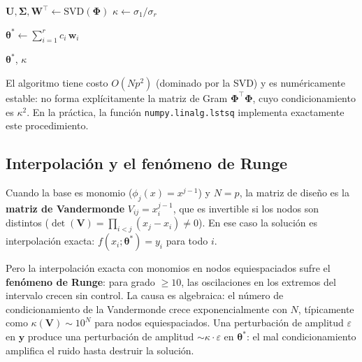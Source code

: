 \begin{algorithm}[H]
\caption{Ajuste por mínimos cuadrados vía SVD}
\label{alg:mc_svd}
 
 
$\bm{U}, \bm{\Sigma}, \bm{W}^\top \leftarrow \mathrm{SVD}(\bm{\Phi})$
$\kappa \leftarrow \sigma_1 / \sigma_r$
 
$\bm{\theta}^* \leftarrow \sum_{i=1}^r c_i\,\bm{w}_i$\;
 
\Return $\bm{\theta}^*$, $\kappa$\;
\end{algorithm}
 
El algoritmo tiene costo $O(Np^2)$ (dominado por la SVD) y es
numéricamente estable: no forma explícitamente la matriz de Gram
$\bm{\Phi}^\top\bm{\Phi}$, cuyo condicionamiento es $\kappa^2$. En la
práctica, la función \texttt{numpy.linalg.lstsq} implementa exactamente
este procedimiento.

\subsection{Interpolación y el fenómeno de Runge}
\label{subsec:interpolacion}


Cuando la base es monomio ($\phi_j(x) = x^{j-1}$) y $N = p$, la
matriz de diseño es la \textbf{matriz de Vandermonde}
$V_{ij} = x_i^{j-1}$, que es invertible si los nodos son distintos
($\det(\bm{V}) = \prod_{i<j}(x_j - x_i) \neq 0$). En ese caso la
solución es interpolación exacta: $f(x_i;\bm{\theta}^*) = y_i$ para
todo $i$.

Pero la interpolación exacta con monomios en nodos equiespaciados
sufre el \textbf{fenómeno de Runge}: para grado $\geq 10$, las
oscilaciones en los extremos del intervalo crecen sin control. La
causa es algebraica: el número de condicionamiento de la Vandermonde
crece exponencialmente con $N$, típicamente como $\kappa(\bm{V})
\sim 10^N$ para nodos equiespaciados. Una perturbación de amplitud
$\varepsilon$ en $\bm{y}$ produce una perturbación de amplitud
$\sim \kappa \cdot \varepsilon$ en $\bm{\theta}^*$: el mal
condicionamiento amplifica el ruido hasta destruir la solución.

